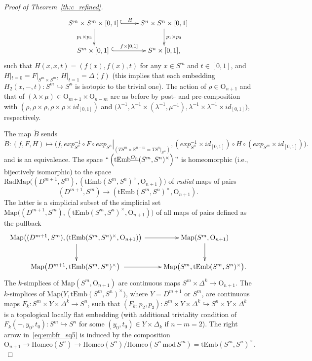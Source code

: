 \documentclass[11pt]{amsart}
\theoremstyle{definition}
\newcommand{\R}{{\mathbb R}}
\newcommand{\tEmb}{\mathrm{tEmb}}
\newcommand{\Map}{\mathrm{Map}}
\newcommand{\Homeo}{\mathrm{Homeo}}
\newcommand{\OO}{\mathrm{O}}
\newcommand{\mmod}{\,\mathrm{mod}\,}
\numberwithin{equation}{section}
\begin{document}
\begin{proof}[Proof of Theorem~\ref{th:c_refined}]
\begin{equation}\label{eq:embfr_sq4}
\xymatrix{
S^m\times S^m\times [0,1]\,\ar@{^{(}->}[r]^-H \ar[d]_{p_1\times p_3}& S^n\times S^n\times [0,1]\ar[d]^{p_1\times p_3}\\
S^m\times [0,1]\,\,\ar@{^{(}->}[r]^{f \times [0,1]}&S^n\times [0,1], %
}
\end{equation}
such that $H(x,x,t)=(f(x),f(x),t)$ %
 for any $x\in S^m$ and $t\in[0,1]$, and $H|_{t=0}=F|_{S^m\times S^m}$, $H|_{t=1}=\Delta(f)$ (this implies that each embedding $H_2(x,-,t)\colon S^m\hookrightarrow S^n$ 
is isotopic to the trivial one). The action of $\rho\in \OO_{n+1}$ and that of  $(\lambda\times\mu)\in\OO_{m+1}\times\OO_{n-m}$ are as before by post- and pre-composition with 
$(\rho,\rho\times\rho,\rho\times\rho\times id_{[0,1]})$ and $\bigl(\lambda^{-1},\lambda^{-1}\times (\lambda^{-1},\mu^{-1}),\lambda^{-1}\times\lambda^{-1}\times id_{[0,1]}\bigr)$, respectively.

The map $\tilde B$ sends
\[
\tilde B\colon (f,F,H)\mapsto \bigl(f, exp^{-1}_{S^n}\circ F\circ\left. exp_{S^n}\right|_{\left(TS^m\times \R^{n-m}=TS^n|_{S^m}\right)}, (exp_{S^n}^{-1}\times id_{[0,1]})\circ H\circ (exp_{S^m}\times id_{[0,1]})\bigr).
\]
and is an equivalence. %
The space $\text{\lq\lq{}}\left(\tEmb^{\underline{O_n}}(S^m,S^n)^\times\right)\text{\rq\rq{}}$ is homeomorphic (i.e., bijectively isomorphic) to the space ${\mathrm{RadMap}}\bigl( (D^{m+1},S^m),(\tEmb(S^m,S^n)^\times,\OO_{n+1})\bigr)$ of {\it radial} maps of pairs 
$$(D^{m+1},S^m)\to (\tEmb(S^m,S^n)^\times,\OO_{n+1}).$$ The latter is a simplicial subset of the simplicial set $\Map\bigl( (D^{m+1},S^m),(\tEmb(S^m,S^n)^\times,\OO_{n+1})\bigr)$
of all maps of pairs defined as  the pullback 
\begin{equation}\label{eq:embfr_sq5}
\xymatrix{
\Map\bigl( (D^{m+1},S^m),(\tEmb(S^m,S^n)^\times,\OO_{n+1})\bigr)\,\ar[r]\ar[d]&\Map(S^m,\OO_{n+1})\ar[d]\\
\Map\bigl(D^{m+1}, \tEmb(S^m,S^n)^\times\bigr)\,\,\ar[r]&\Map\bigl(S^m, \tEmb(S^m,S^n)^\times\bigr).
}
\end{equation}
The $k$-simplices of $\Map(S^m,\OO_{n+1})$ are continuous maps $S^m\times\Delta^k\to\OO_{n+1}$. The $k$-simplices of $\Map\bigl(Y, \tEmb(S^m,S^n)^\times\bigr)$, where $Y=D^{m+1}$ or $S^m$,
are continuous maps $F_k\colon S^m\times Y\times\Delta^k\to S^n$, such that $(F_k,p_2,p_3)\colon S^m\times Y\times \Delta^k\hookrightarrow S^n\times Y\times \Delta^k$ is a topological locally flat embedding
(with additional triviality condition of $F_k(-,y_0,t_0):S^m\hookrightarrow S^n$ for some $(y_0,t_0)\in Y\times \Delta_k$ if $n-m=2$). The right arrow in~\eqref{eq:embfr_sq5} is induced by the composition
\[
\OO_{n+1}\to\Homeo(S^n)\to \Homeo(S^n)/\Homeo(S^n\mmod S^m)=\tEmb(S^m,S^n)^\times.
\]


\end{proof}
\end{document}
